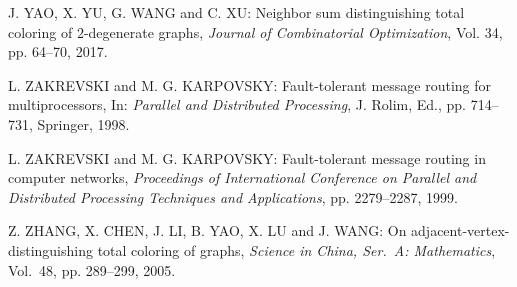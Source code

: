 \begin{thebibliography}{999}
J. YAO, X. YU, G. WANG and C. XU: Neighbor sum distinguishing total coloring of $2$-degenerate graphs, {\it Journal of Combinatorial Optimization}, Vol. 34, pp. 64--70, 2017.  

L. ZAKREVSKI and M. G. KARPOVSKY: Fault-tolerant message routing for multiprocessors, In: {\it Parallel and Distributed Processing}, J. Rolim, Ed., pp. 714--731, Springer, 1998.

L. ZAKREVSKI and M. G. KARPOVSKY: Fault-tolerant message routing in computer networks, {\it Proceedings of International Conference on Parallel and Distributed Processing Techniques and Applications}, pp. 2279--2287, 1999.

Z. ZHANG, X. CHEN, J. LI, B. YAO, X. LU and J. WANG: On adjacent-vertex-distinguishing total coloring of graphs, {\it Science in China, Ser.~A: Mathematics}, Vol.~48, pp. 289--299, 2005.
\end{thebibliography}

